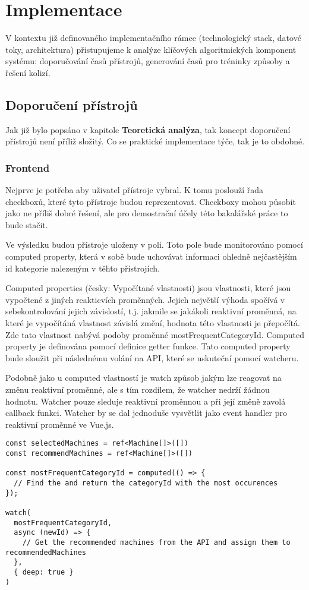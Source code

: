 \chapter{Implementace}
V kontextu již definovaného implementačního rámce (technologický stack, datové toky, architektura) přistupujeme k analýze klíčových algoritmických komponent systému: doporučování časů přístrojů, generování časů pro tréninky způsoby a řešení kolizí.

\section{Doporučení přístrojů}
Jak již bylo popsáno v kapitole \textbf{Teoretická analýza}, tak koncept doporučení přístrojů není příliž složitý. Co se praktické implementace týče, tak je to obdobné.

\subsection{Frontend}
Nejprve je potřeba aby uživatel přístroje vybral. K tomu poslouží řada checkboxů, které tyto přístroje budou reprezentovat. Checkboxy mohou působit jako ne příliš dobré řešení, ale pro demostrační účely této bakalářské práce to bude stačit.

Ve výsledku budou přístroje uloženy v poli. Toto pole bude monitorováno pomocí computed property, která v sobě bude uchovávat informaci ohledně nejčastějším id kategorie nalezeným v těhto přístrojích.

Computed properties (česky: Vypočítané vlastnosti) jsou vlastnosti, které jsou vypočtené z jiných reakticvích proměnných. Jejich největší výhoda spočívá v sebekontrolování jejich závislostí, t.j. jakmile se jakákoli reaktivní proměnná, na které je vypočítáná vlastnost závislá změní, hodnota této vlastnosti je přepočítá. Zde tato vlastnost nabývá podoby proměnné mostFrequentCategoryId. Computed property je definována pomocí definice getter funkce. Tato computed property bude sloužit při následnému volání na API, které se uskuteční pomocí watcheru.

Podobně jako u computed vlastností je watch způsob jakým lze reagovat na změnu reaktivní proměnné, ale s tím rozdílem, že watcher nedrží žádnou hodnotu. Watcher pouze sleduje reaktivní proměnnou a při její změně zavolá callback funkci. Watcher by se dal jednoduše vysvětlit jako event handler pro reaktivní proměnné ve Vue.js.

\begin{lstlisting}
const selectedMachines = ref<Machine[]>([])
const recommendMachines = ref<Machine[]>([])

const mostFrequentCategoryId = computed(() => {
  // Find the and return the categoryId with the most occurences
});

watch(
  mostFrequentCategoryId,
  async (newId) => {
    // Get the recommended machines from the API and assign them to recommendedMachines
  },
  { deep: true }
)
\end{lstlisting}

